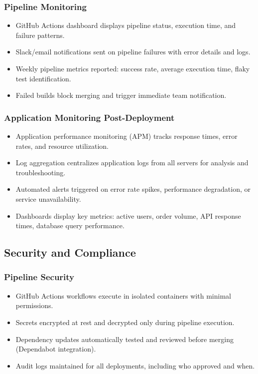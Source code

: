 \documentclass[12pt,a4paper]{article}
\begin{document}
\subsubsection{Pipeline Monitoring}

\begin{itemize}[leftmargin=2em, itemsep=6pt]
    \item GitHub Actions dashboard displays pipeline status, execution time, and failure patterns.
    \item Slack/email notifications sent on pipeline failures with error details and logs.
    \item Weekly pipeline metrics reported: success rate, average execution time, flaky test identification.
    \item Failed builds block merging and trigger immediate team notification.
\end{itemize}

\subsubsection{Application Monitoring Post-Deployment}

\begin{itemize}[leftmargin=2em, itemsep=6pt]
    \item Application performance monitoring (APM) tracks response times, error rates, and resource utilization.
    \item Log aggregation centralizes application logs from all servers for analysis and troubleshooting.
    \item Automated alerts triggered on error rate spikes, performance degradation, or service unavailability.
    \item Dashboards display key metrics: active users, order volume, API response times, database query performance.
\end{itemize}

\subsection{Security and Compliance}

\subsubsection{Pipeline Security}

\begin{itemize}[leftmargin=2em, itemsep=6pt]
    \item GitHub Actions workflows execute in isolated containers with minimal permissions.
    \item Secrets encrypted at rest and decrypted only during pipeline execution.
    \item Dependency updates automatically tested and reviewed before merging (Dependabot integration).
    \item Audit logs maintained for all deployments, including who approved and when.
\end{itemize}
\end{document}
